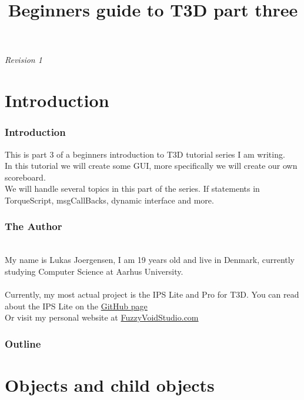 
\title{Beginners guide to T3D part three}

\begin{frame}
\titlepage
{\it Revision 1}
\end{frame}

\section{Introduction}
\begin{frame}
\frametitle{Introduction}
	This is part 3 of a beginners introduction to T3D tutorial series I am writing.\\
	In this tutorial we will create some GUI, more specifically we will create our own scoreboard.\\
	We will handle several topics in this part of the series. If statements in TorqueScript, msgCallBacks, dynamic interface and more.
\end{frame}
\begin{frame}[fragile]
\frametitle{The Author}
	\\
	My name is Lukas Joergensen, I am 19 years old and live in Denmark, currently studying Computer Science at Aarhus University.\\
	\\
	Currently, my most actual project is the IPS Lite and Pro for T3D. You can read about the IPS Lite on the {\color{blue}\href{https://github.com/lukaspj/IPS-Lite-for-T3D}{GitHub page}}\\
	Or visit my personal website at {\color{blue}\href{http://fuzzyvoidstudio.com/}{FuzzyVoidStudio.com}}
\end{frame}
\begin{frame}
\frametitle{Outline}
\tableofcontents[]
\end{frame}

\section{Objects and child objects}


